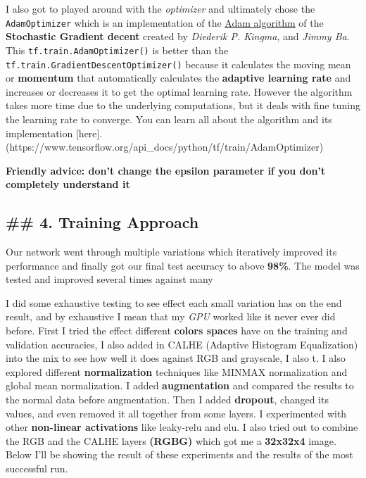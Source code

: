 \documentclass[11pt]{article}
\begin{document}
I also got to played around with the \emph{optimizer} and ultimately
chose the \texttt{AdamOptimizer} which is an implementation of the
\href{https://arxiv.org/pdf/1412.6980.pdf}{Adam algorithm} of the
\textbf{Stochastic Gradient decent} created by \emph{Diederik P.
Kingma}, and \emph{Jimmy Ba}. This \texttt{tf.train.AdamOptimizer()} is
better than the \texttt{tf.train.GradientDescentOptimizer()} because it
calculates the moving mean or \textbf{momentum} that automatically
calculates the \textbf{adaptive learning rate} and increases or
decreases it to get the optimal learning rate. However the algorithm
takes more time due to the underlying computations, but it deals with
fine tuning the learning rate to converge. You can learn all about the
algorithm and its implementation
{[}here{]}.(https://www.tensorflow.org/api\_docs/python/tf/train/AdamOptimizer)

\textbf{Friendly advice: don't change the epsilon parameter if you don't
completely understand it}

    \hypertarget{training-approach}{%
\subsection{\#\# 4. Training Approach}\label{training-approach}}

Our network went through multiple variations which iteratively improved
its performance and finally got our final test accuracy to above
\textbf{98\%}. The model was tested and improved several times against
many

I did some exhaustive testing to see effect each small variation has on
the end result, and by exhaustive I mean that my \emph{GPU} worked like
it never ever did before. First I tried the effect different
\textbf{colors spaces} have on the training and validation accuracies, I
also added in CALHE (Adaptive Histogram Equalization) into the mix to
see how well it does against RGB and grayscale, I also t. I also
explored different \textbf{normalization} techniques like MINMAX
normalization and global mean normalization. I added
\textbf{augmentation} and compared the results to the normal data before
augmentation. Then I added \textbf{dropout}, changed its values, and
even removed it all together from some layers. I experimented with other
\textbf{non-linear activations} like leaky-relu and elu. I also tried
out to combine the RGB and the CALHE layers \textbf{(RGBG)} which got me
a \textbf{32x32x4} image. Below I'll be showing the result of these
experiments and the results of the most successful run.
\end{document}
